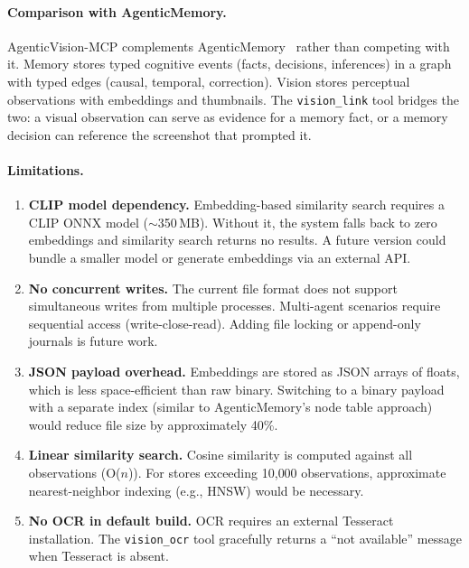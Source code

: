 \documentclass[10pt, twocolumn]{article}
\begin{document}
\paragraph{Comparison with AgenticMemory.}
AgenticVision-MCP complements AgenticMemory~\cite{owolabi2025agenticmemory,owolabi2025queryexpansion,owolabi2025memorymcp} rather than competing with it. Memory stores typed cognitive events (facts, decisions, inferences) in a graph with typed edges (causal, temporal, correction). Vision stores perceptual observations with embeddings and thumbnails. The \texttt{vision\_link} tool bridges the two: a visual observation can serve as evidence for a memory fact, or a memory decision can reference the screenshot that prompted it.

\paragraph{Limitations.}

\begin{enumerate}[nosep,leftmargin=*]
\item \textbf{CLIP model dependency.} Embedding-based similarity search requires a CLIP ONNX model ($\sim$350\,MB). Without it, the system falls back to zero embeddings and similarity search returns no results. A future version could bundle a smaller model or generate embeddings via an external API.

\item \textbf{No concurrent writes.} The current file format does not support simultaneous writes from multiple processes. Multi-agent scenarios require sequential access (write-close-read). Adding file locking or append-only journals is future work.

\item \textbf{JSON payload overhead.} Embeddings are stored as JSON arrays of floats, which is less space-efficient than raw binary. Switching to a binary payload with a separate index (similar to AgenticMemory's node table approach) would reduce file size by approximately 40\%.

\item \textbf{Linear similarity search.} Cosine similarity is computed against all observations (O($n$)). For stores exceeding 10{,}000 observations, approximate nearest-neighbor indexing (e.g., HNSW) would be necessary.

\item \textbf{No OCR in default build.} OCR requires an external Tesseract installation. The \texttt{vision\_ocr} tool gracefully returns a ``not available'' message when Tesseract is absent.
\end{enumerate}
\end{document}
